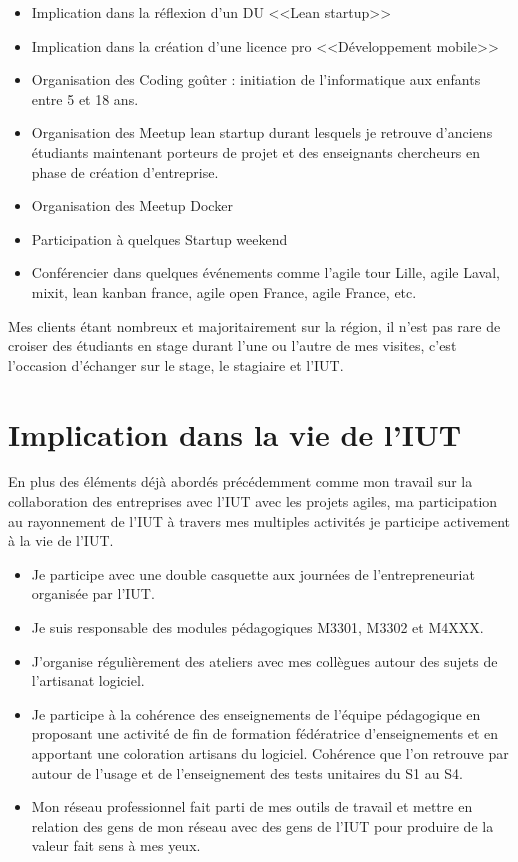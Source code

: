 \documentclass[a4paper]{article}
\begin{document}
\begin{itemize}
  \item Implication dans la réflexion d'un DU <<Lean startup>>
  \item Implication dans la création d'une licence pro <<Développement mobile>> 
  \item Organisation des Coding goûter : initiation de l'informatique aux enfants entre 5 et 18 ans.
  \item Organisation des Meetup lean startup durant lesquels je retrouve d'anciens étudiants maintenant porteurs de projet et des enseignants chercheurs en phase de création d'entreprise.
  \item Organisation des Meetup Docker
  \item Participation à quelques Startup weekend
  \item Conférencier dans quelques événements comme l'agile tour Lille, agile Laval, mixit, lean kanban france, agile open France, agile France, etc.
\end{itemize}

Mes clients étant nombreux et majoritairement sur la région, il n'est pas rare de croiser des étudiants en stage durant l'une ou l'autre de mes visites, c'est l'occasion d'échanger sur le stage, le stagiaire et l'IUT.

\section{Implication dans la vie de l'IUT}

En plus des éléments déjà abordés précédemment comme mon travail sur la collaboration des entreprises avec l'IUT avec les projets agiles, ma participation au rayonnement de l'IUT à travers mes multiples activités je participe activement à la vie de l'IUT.

\begin{itemize}
  \item Je participe avec une double casquette aux journées de l'entrepreneuriat organisée par l'IUT.
  \item Je suis responsable des modules pédagogiques M3301, M3302 et M4XXX.
  \item J'organise régulièrement des ateliers avec mes collègues autour des sujets de l'artisanat logiciel.
  \item Je participe à la cohérence des enseignements de l'équipe pédagogique en proposant une activité de fin de formation fédératrice d'enseignements et en apportant une coloration artisans du logiciel. Cohérence que l'on retrouve par autour de l'usage et de l'enseignement des tests unitaires du S1 au S4.
  \item Mon réseau professionnel fait parti de mes outils de travail et mettre en relation des gens de mon réseau avec des gens de l'IUT pour produire de la valeur fait sens à mes yeux.
\end{itemize}
\end{document}

